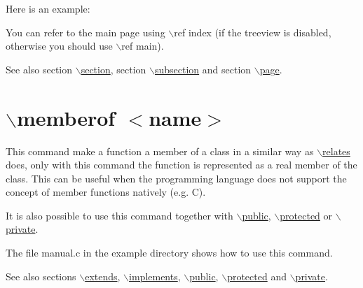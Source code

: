 Here is an example: 


You can refer to the main page using $\backslash$ref index (if the treeview is disabled, otherwise you should use $\backslash$ref main).

\begin{DoxySeeAlso}{See also}
section \hyperlink{commands_cmdsection}{$\backslash$section}, section \hyperlink{commands_cmdsubsection}{$\backslash$subsection} and section \hyperlink{commands_cmdpage}{$\backslash$page}.
\end{DoxySeeAlso}


 \hypertarget{commands_cmdmemberof}{}\section{$\backslash$memberof $<$name$>$}\label{commands_cmdmemberof}
 This command make a function a member of a class in a similar way as \hyperlink{commands_cmdrelates}{$\backslash$relates} does, only with this command the function is represented as a real member of the class. This can be useful when the programming language does not support the concept of member functions natively (e.g. C).

It is also possible to use this command together with \hyperlink{commands_cmdpublic}{$\backslash$public}, \hyperlink{commands_cmdprotected}{$\backslash$protected} or \hyperlink{commands_cmdprivate}{$\backslash$private}.

The file {\ttfamily manual.c} in the example directory shows how to use this command.



\begin{DoxySeeAlso}{See also}
sections \hyperlink{commands_cmdextends}{$\backslash$extends}, \hyperlink{commands_cmdimplements}{$\backslash$implements}, \hyperlink{commands_cmdpublic}{$\backslash$public}, \hyperlink{commands_cmdprotected}{$\backslash$protected} and \hyperlink{commands_cmdprivate}{$\backslash$private}.
\end{DoxySeeAlso}


